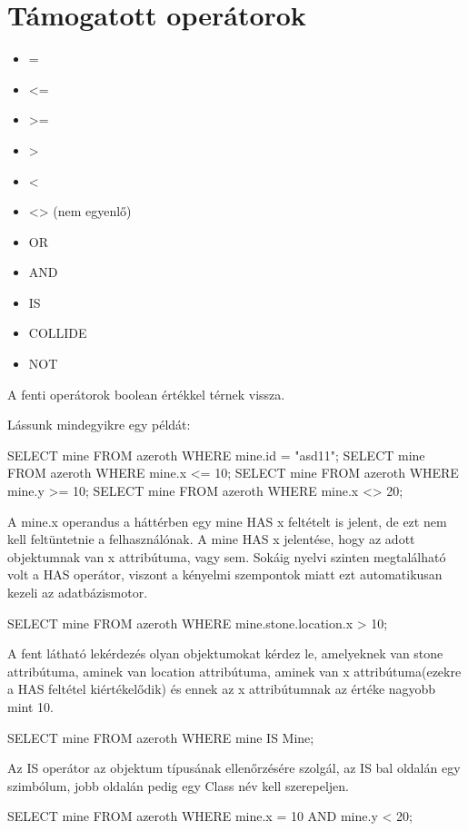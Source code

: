 \section{Támogatott operátorok}
\begin{itemize}
\item = 
\item <= 
\item >= 
\item > 
\item < 
\item <> (nem egyenlő) 
\item OR 
\item AND 
\item IS 
\item COLLIDE
\item NOT
\end{itemize}

A fenti operátorok boolean értékkel térnek vissza.

Lássunk mindegyikre egy példát:
\begin{sql}
SELECT mine FROM azeroth WHERE mine.id = "asd11";
SELECT mine FROM azeroth WHERE mine.x <= 10;
SELECT mine FROM azeroth WHERE mine.y >= 10;
SELECT mine FROM azeroth WHERE mine.x <> 20;
\end{sql}


A mine.x operandus a háttérben egy mine HAS x feltételt is jelent, de ezt nem kell feltüntetnie a felhasználónak. A mine HAS x jelentése, hogy az adott objektumnak van x attribútuma, vagy sem. Sokáig nyelvi szinten megtalálható volt a HAS operátor, viszont a kényelmi szempontok miatt ezt automatikusan kezeli az adatbázismotor.
 
\begin{sql}
SELECT mine FROM azeroth WHERE mine.stone.location.x > 10;
\end{sql}

A fent látható lekérdezés olyan objektumokat kérdez le, amelyeknek van stone attribútuma, aminek van location attribútuma, aminek van x attribútuma(ezekre a HAS feltétel kiértékelődik) és ennek az x attribútumnak az értéke nagyobb mint 10.

\begin{sql}
SELECT mine FROM azeroth WHERE mine IS Mine;
\end{sql}

Az IS operátor az objektum típusának ellenőrzésére szolgál, az IS bal oldalán egy szimbólum, jobb oldalán pedig egy Class név kell szerepeljen.

\begin{sql}
SELECT mine FROM azeroth WHERE mine.x = 10 AND mine.y < 20;
\end{sql}

